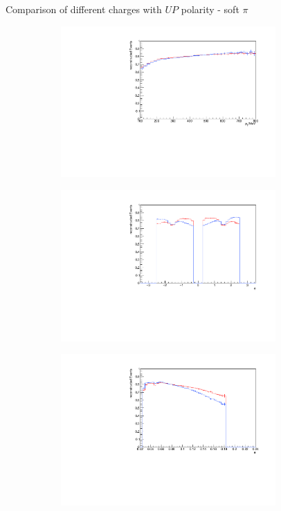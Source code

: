 \documentclass[11pt]{beamer}
\begin{document}
\begin{frame}{Comparison of different charges with $UP$ polarity - soft $\pi$}
\begin{figure}
\begin{subfigure}{0.45\textwidth}
\includegraphics[width=0.9\textwidth]{first/up_pdf/combined/h_pt_reco_SPi.pdf}
\end{subfigure}
\begin{subfigure}{0.45\textwidth}
\includegraphics[width=0.9\textwidth]{first/up_pdf/combined/h_phi_reco_SPi.pdf}
\end{subfigure}
\begin{subfigure}{0.45\textwidth}
\includegraphics[width=0.9\textwidth]{first/up_pdf/combined/h_theta_reco_SPi.pdf}

\end{subfigure}
\end{figure}
\end{frame}
\end{document}
